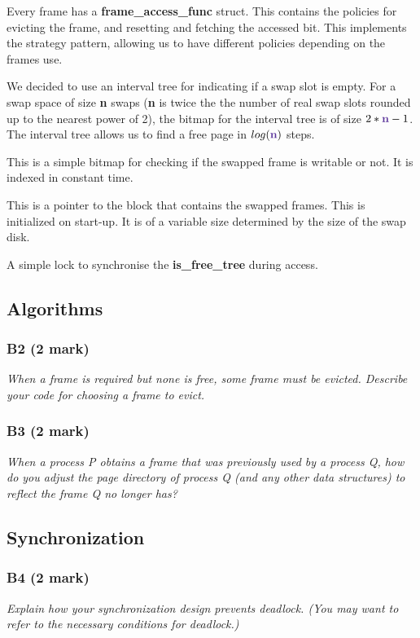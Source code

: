 \documentclass{report}
\newcommand{\question}[1]{\textit{#1} \ }
\newcommand{\file}[1]{\textcolor{YellowGreen}{\textbf{#1}}}
\newcommand{\var}[1]{\textcolor{RoyalPurple}{\textbf{#1}}}
\newcommand{\pintoscode}[4]{}
\newcommand{\pintosfile}[3]{\pintoscode{#1}{#2}{\file{#3}}{#3}}
\begin{document}
		\pintosfile{22}{26}{swap.c}
			Every frame has a \var{frame\_access\_func} struct. This contains
			the policies for evicting the frame, and resetting and fetching the accessed bit. 
			This implements the strategy pattern, allowing us to have different policies
			depending on the frames use.
		
		
		\pintosfile{30}{30}{swap.c}
      We decided to use an interval tree for indicating if a swap slot is empty.
      For a swap space of size \var{n} swaps (\var{n} is twice the
      the number of real swap slots rounded up to the nearest power of 2), the bitmap for the interval tree is
      of size $2*\var{n}-1$. The interval tree allows us to find a free page in 
      $log(\var{n})$ steps.
		
		\pintosfile{31}{31}{swap.c}
      This is a simple bitmap for checking if the swapped frame is writable or not. 
			It is indexed in constant time.

		\pintosfile{33}{33}{swap.c}
      This is a pointer to the block that contains the swapped frames. This is initialized
      on start-up. It is of a variable size determined by the size of the swap disk.

		\pintosfile{35}{35}{swap.c}
		  A simple lock to synchronise the \var{is\_free\_tree} during access.
		
		\subsection*{Algorithms}
			\subsubsection*{B2 (2 mark)}
				\question{When a frame is required but none is free, some frame must be evicted.
				Describe your code for choosing a frame to evict.}
			
			\subsubsection*{B3 (2 mark)}
				\question{When a process P obtains a frame that was previously used by a 
				process Q, how do you adjust the page directory of process Q 
				(and any other data structures) to reflect the frame Q no longer has?}

		\subsection*{Synchronization}
			\subsubsection*{B4 (2 mark)}
				\question{Explain how your synchronization design prevents deadlock.
				(You may want to refer to the necessary conditions for deadlock.)}
\end{document}

